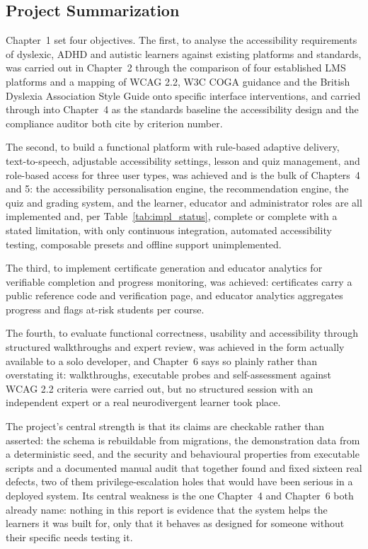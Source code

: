\documentclass[12pt, oneside]{article} %
\begin{document}
\subsection{Project Summarization}

Chapter~1 set four objectives. The first, to analyse the accessibility requirements of dyslexic, ADHD and autistic learners against existing platforms and standards, was carried out in Chapter~2 through the comparison of four established LMS platforms and a mapping of WCAG 2.2, W3C COGA guidance and the British Dyslexia Association Style Guide onto specific interface interventions, and carried through into Chapter~4 as the standards baseline the accessibility design and the compliance auditor both cite by criterion number.

The second, to build a functional platform with rule-based adaptive delivery, text-to-speech, adjustable accessibility settings, lesson and quiz management, and role-based access for three user types, was achieved and is the bulk of Chapters~4 and 5: the accessibility personalisation engine, the recommendation engine, the quiz and grading system, and the learner, educator and administrator roles are all implemented and, per Table~\ref{tab:impl_status}, complete or complete with a stated limitation, with only continuous integration, automated accessibility testing, composable presets and offline support unimplemented.

The third, to implement certificate generation and educator analytics for verifiable completion and progress monitoring, was achieved: certificates carry a public reference code and verification page, and educator analytics aggregates progress and flags at-risk students per course.

The fourth, to evaluate functional correctness, usability and accessibility through structured walkthroughs and expert review, was achieved in the form actually available to a solo developer, and Chapter~6 says so plainly rather than overstating it: walkthroughs, executable probes and self-assessment against WCAG 2.2 criteria were carried out, but no structured session with an independent expert or a real neurodivergent learner took place.

The project's central strength is that its claims are checkable rather than asserted: the schema is rebuildable from migrations, the demonstration data from a deterministic seed, and the security and behavioural properties from executable scripts and a documented manual audit that together found and fixed sixteen real defects, two of them privilege-escalation holes that would have been serious in a deployed system. Its central weakness is the one Chapter~4 and Chapter~6 both already name: nothing in this report is evidence that the system helps the learners it was built for, only that it behaves as designed for someone without their specific needs testing it.
\end{document}
